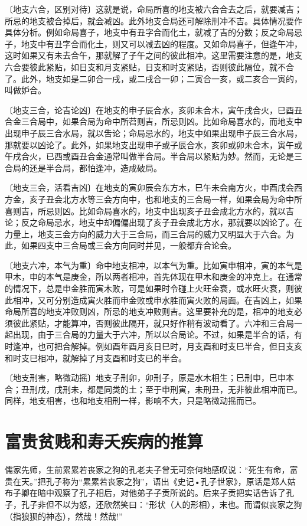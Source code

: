 \documentclass[a5paper,oneside,12pt]{ctexbook}
\begin{document}
〔地支六合，区别对待〕这就是说，命局所喜的地支被六合合去之后，就要减吉；所忌的地支被合掉后，就会减凶。此外地支合局还可解除刑冲不吉。具体情况要作具体分析。例如命局喜子，地支中有丑字合而化土，就减了吉的分数；反之命局忌子，地支中有丑字合而化土，则又可以减去凶的程度。又如命局喜子，但逢午冲，这时如果又有未去合午，那就解了子午之间的彼此相冲。这里需要注意的是，地支六合要彼此紧贴，如日支和月支紧贴，日支和时支紧贴，否则彼此隔位，就不合了。此外，地支如是二卯合一戌，或二戌合一卯；二寅合一亥，或二亥合一寅的，叫做妒合。

〔地支三合，论吉论凶〕在地支的申子辰合水，亥卯未合木，寅午戌合火，巳酉丑合金三合局中，如果合局为命中所苕则吉，所忌则凶。比如命局喜水的，而地支中出现申子辰三合水局，就以吿论；命局忌水的，地支中如果出现申子辰三合水局，那就要以凶论了。此外，如果地支出现申子或子辰合水，亥卯或卯未合木，寅午或午戌合火，已西或酉丑合金通常叫做半合局。半合局以紧贴为妙。然而，无论是三合局的还是半合局，都怕逢冲，造成破局。

〔地支三会，活看吉凶〕在地支的寅卯辰会东方木，巳午未会南方火，申酉戌会西方金，亥子丑会北方水等三会方向中，也和地支的三合局一样，如果会局为命中所喜则吉，所忌则凶。比如命局喜水的，地支中出现亥子丑会成北方水的，就以吉论；反之命局忌水，地支中却偏偏出现了亥子丑会成北方水，那就要以凶论了。在力量上，地支三会方向的威力大于三合局，而三合局的威力又明显大于六合。为此，如果四支中三合局或三会方向同时并见，一般都弃合论会。

〔地支六冲，本气为重〕命中地支相冲，以本气为重。比如寅申相冲，寅的本气是甲木，申的本气是庚金，所以两者相冲，首先体现在甲木和庚金的冲克上。在通常的情况下，总是申金胜而寅木败，可是如果时令碰上火旺金衰，或水旺火衰，则彼此相冲，又可分别造成寅火胜而申金败或申水胜而寅火败的局面。在吉凶上，如果命局所喜的地支冲败则凶，所忌的地支冲败则吉。这里要补充的是，相冲的地支必须彼此紧贴，才能算冲，否则彼此隔开，就只好作稍有波动看了。六冲和三合局一起出现，由于三合局的力量大于六冲，所以以合局论。不过，如果是半合的话，有时逢冲，也可把合解掉。例如酉年酉月亥日巳时，月支酉和时支巳半合，但日支亥和时支巳相冲，就解掉了月支酉和时支已的半合。

〔地支刑害，略微动摇〕地支子刑卯，卯刑子，原是水木相生；巳刑申，巳申本合；丑刑戌，戌刑未，都是同类的土；至于申刑寅，未刑丑，无非彼此相冲而已。同样，地支相害，也和地支相刑一样，影响不大，只是略微动摇而已。

\section{富贵贫贱和寿夭疾病的推算}

儒家先师，生前累累若丧家之狗的孔老夫子曾无可奈何地感叹说：“死生有命，富贵在天。”把孔子称为“累累若丧家之狗”，语出《史记•孔子世家》，原话是郑人姑布子卿在暗中观察了孔子相后，对他弟子子贡所说的。后来子贡把实话告诉了孔子，孔子非但不以为怒，还欣然笑曰：“形状（人的形相），末也。而谓似丧家之狗（指狼狈的神态），然哉！然哉!”
\end{document}
